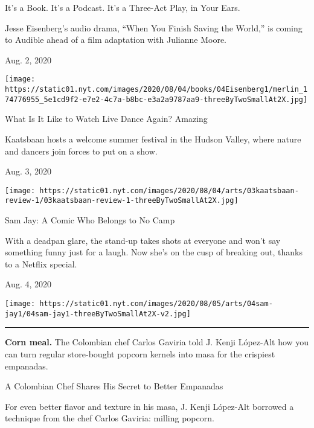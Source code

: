 It's a Book. It's a Podcast. It's a Three-Act Play, in Your Ears.

Jesse Eisenberg's audio drama, ``When You Finish Saving the World,'' is
coming to Audible ahead of a film adaptation with Julianne Moore.

Aug. 2, 2020

\texttt{[image: https://static01.nyt.com/images/2020/08/04/books/04Eisenberg1/merlin\_174776955\_5e1cd9f2-e7e2-4c7a-b8bc-e3a2a9787aa9-threeByTwoSmallAt2X.jpg]}

\href{https://www.nytimes.com/2020/08/03/arts/dance/kaatsbaan-dance.html?action=click\&module=RelatedLinks\&pgtype=collection}{}

What Is It Like to Watch Live Dance Again? Amazing

Kaatsbaan hosts a welcome summer festival in the Hudson Valley, where
nature and dancers join forces to put on a show.

Aug. 3, 2020

\texttt{[image: https://static01.nyt.com/images/2020/08/04/arts/03kaatsbaan-review-1/03kaatsbaan-review-1-threeByTwoSmallAt2X.jpg]}

\href{https://www.nytimes.com/2020/08/04/arts/television/sam-jay-netflix-special.html?action=click\&module=RelatedLinks\&pgtype=collection}{}

Sam Jay: A Comic Who Belongs to No Camp

With a deadpan glare, the stand-up takes shots at everyone and won't say
something funny just for a laugh. Now she's on the cusp of breaking out,
thanks to a Netflix special.

Aug. 4, 2020

\texttt{[image: https://static01.nyt.com/images/2020/08/05/arts/04sam-jay1/04sam-jay1-threeByTwoSmallAt2X-v2.jpg]}

\begin{center}\rule{0.5\linewidth}{\linethickness}\end{center}

\textbf{Corn meal.} The Colombian chef Carlos Gaviria told J. Kenji
López-Alt how you can turn regular store-bought popcorn kernels into
masa for the crispiest empanadas.

\href{https://www.nytimes.com/2020/08/04/dining/colombian-empanadas-carlos-gaviria.html?action=click\&module=RelatedLinks\&pgtype=collection}{}

A Colombian Chef Shares His Secret to Better Empanadas

For even better flavor and texture in his masa, J. Kenji López-Alt
borrowed a technique from the chef Carlos Gaviria: milling popcorn.


